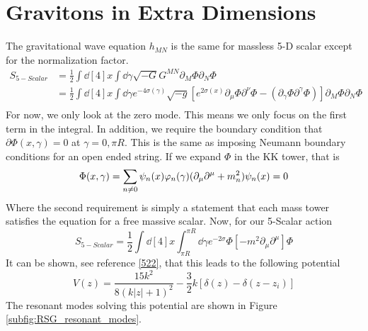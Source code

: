 \documentclass[12pt]{article}
\newcommand{\pd}{\partial}
\begin{document}
\section{Gravitons in Extra Dimensions}
The gravitational wave equation $h_{MN}$ is the same for massless 5-D scalar
except for the normalization factor.
\begin{align}
    S_{5-Scalar} &= \frac{1}{2} \int \dd[4]{x} \int \dd \gamma \sqrt{-G} G^{MN}
    \pd_M \Phi \pd_N \Phi \\
                 &= \frac{1}{2} \int \dd[4]{x} \int \dd \gamma
                 e^{-4\sigma(\gamma)} \sqrt{-g} \left[ e^{2\sigma(x)} \pd_\mu
                 \Phi \pd^\nu \Phi - ( \pd_\gamma \Phi \pd^\gamma \Phi ) \right]
    \pd_M \Phi \pd_N \Phi \\
\end{align}
For now, we only look at the zero mode. This means we only focus on the first
term in the integral. In addition, we require the boundary condition that
$\pd\Phi(x,\gamma)=0$ at $\gamma=0, \pi R$. This is the same as imposing Neumann
boundary conditions for an open ended string. If we expand $\Phi$ in the KK
tower, that is
\begin{equation}
    \Phi(x,\gamma) = \sum_{n\neq 0} \psi_n(x) \varphi_n (\gamma) \\
    (\pd_\mu \pd^\mu + m_n^2) \psi_n(x) = 0
\end{equation}
Where the second requirement is simply a statement that each mass tower
satisfies the equation for a free massive scalar. Now, for our 5-Scalar action
\begin{equation}
    S_{5-Scalar} = \frac{1}{2} \int \dd[4]{x} \int^{\pi R}_{\pi R} \dd \gamma
    e^{-2\sigma} \Phi \left[ -m^2 \pd_\mu \pd^\mu \right] \Phi 
\end{equation}
It can be shown, see reference \ref{522}, that this leads to the following
potential
\begin{equation}
    V(z) = \frac{15k^2}{8(k|z|+1)^2} - \frac{3}{2}k\left[ \delta(z) - \delta(z -
    z_i) \right]
\end{equation}
The resonant modes solving this potential are shown in Figure
\ref{subfig:RSG_resonant_modes}.

\newpage

\end{document}
